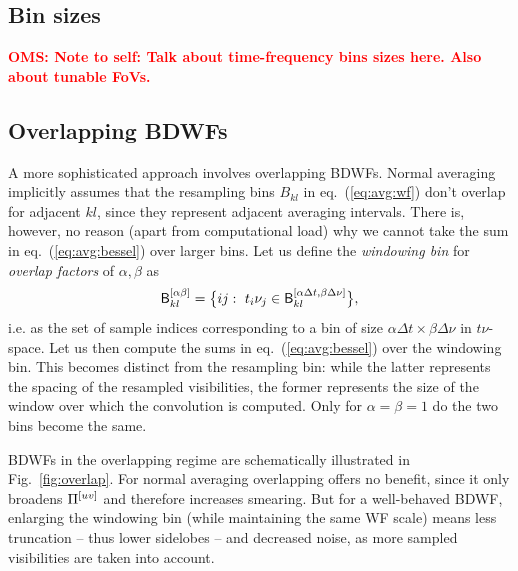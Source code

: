 \documentclass[useAMS,usenatbib]{mn2e}
\newcommand{\OMS}[1]{\textcolor{red}{{\bf OMS: #1}}}
\begin{document}
\subsection{Bin sizes}

\OMS{Note to self: Talk about time-frequency bins sizes here. Also about tunable FoVs.}


\subsection{Overlapping BDWFs}
\label{baseline2}

A more sophisticated approach involves overlapping BDWFs. Normal averaging implicitly assumes that the resampling bins $B_{kl}$ 
in eq.~(\ref{eq:avg:wf}) don't overlap for adjacent $kl$, since they represent adjacent averaging intervals. 
There is, however, no reason (apart from computational load) why we cannot take the sum in eq.~(\ref{eq:avg:bessel}) 
over larger bins. Let us define the \emph{windowing bin} for \emph{overlap factors} of $\alpha,\beta$ as
\begin{equation}
\mathsf{B}^{[\alpha\beta]}_{kl} = \big \{ ij:~t_i\nu_j \in \mathsf{B}^{[\alpha\Delta t,\beta\Delta\nu]}_{kl} \big \},
\end{equation}
i.e. as the set of sample indices corresponding to a bin of size $\alpha\Delta t\times\beta\Delta \nu$ in $t\nu$-space.
Let us then compute the sums in eq.~(\ref{eq:avg:bessel}) over the windowing bin. This becomes distinct from the
resampling bin: while the latter represents the spacing of the resampled visibilities, the former represents the size 
of the window over which the convolution is computed. Only for $\alpha=\beta=1$ do the two bins become the same.

BDWFs in the overlapping regime are schematically illustrated in Fig.~\ref{fig:overlap}. For normal averaging 
overlapping offers no benefit, since it only broadens $\Pi^{[uv]}$ and therefore increases smearing. But for a well-behaved 
BDWF, enlarging the windowing bin (while maintaining the same WF scale) means less truncation -- thus lower 
sidelobes -- and decreased noise, as more sampled visibilities are taken into account.
\end{document}
